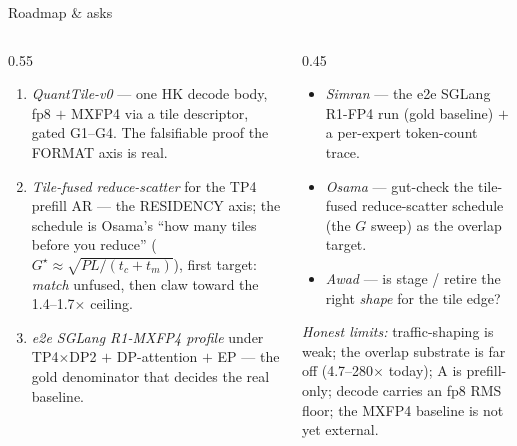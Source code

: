 \documentclass[pdf,aspectratio=169]{beamer}
\newcommand{\empy}[1]{{\color{darkorange}\emph{#1}}}
\newcommand{\empr}[1]{{\color{cardinalred}\emph{#1}}}
\newcommand{\examplebox}[2]{%
\begin{tcolorbox}[colframe=darkcardinal,colback=boxgray,title={#1}]
#2
\end{tcolorbox}}
\newcommand{\mc}[1]{{\ttfamily\small #1}}
\begin{document}
\begin{frame}{Roadmap \& asks}
\footnotesize
\begin{columns}
\begin{column}{0.55\textwidth}
\begin{enumerate}\footnotesize
  \item \empr{QuantTile-v0} --- one HK decode body, fp8 $+$ MXFP4 via a tile descriptor, gated G1--G4. The falsifiable proof the FORMAT axis is real.
  \item \empy{Tile-fused reduce-scatter} for the TP4 prefill AR --- the RESIDENCY axis; the schedule is Osama's ``how many tiles before you reduce'' ($G^\star\!\approx\!\sqrt{P L/(t_c+t_m)}$), first target: \emph{match} unfused, then claw toward the 1.4--1.7$\times$ ceiling.
  \item \empy{e2e SGLang R1-MXFP4 profile} under TP4$\times$DP2 $+$ DP-attention $+$ EP --- the gold denominator that decides the real baseline.
\end{enumerate}
\end{column}
\begin{column}{0.45\textwidth}
\examplebox{What I'd like from you}{\footnotesize
\begin{itemize}\scriptsize
  \item \empy{Simran} --- the e2e SGLang R1-FP4 run (gold baseline) $+$ a per-expert token-count trace.
  \item \empy{Osama} --- gut-check the tile-fused reduce-scatter schedule (the $G$ sweep) as the overlap target.
  \item \empy{Awad} --- is \mc{stage} / \mc{retire} the right \emph{shape} for the tile edge?
\end{itemize}}
\empr{Honest limits:} traffic-shaping is weak; the overlap substrate is far off (4.7--280$\times$ today); A is prefill-only; decode carries an fp8 RMS floor; the MXFP4 baseline is not yet external.
\end{column}
\end{columns}
\end{frame}
\end{document}
